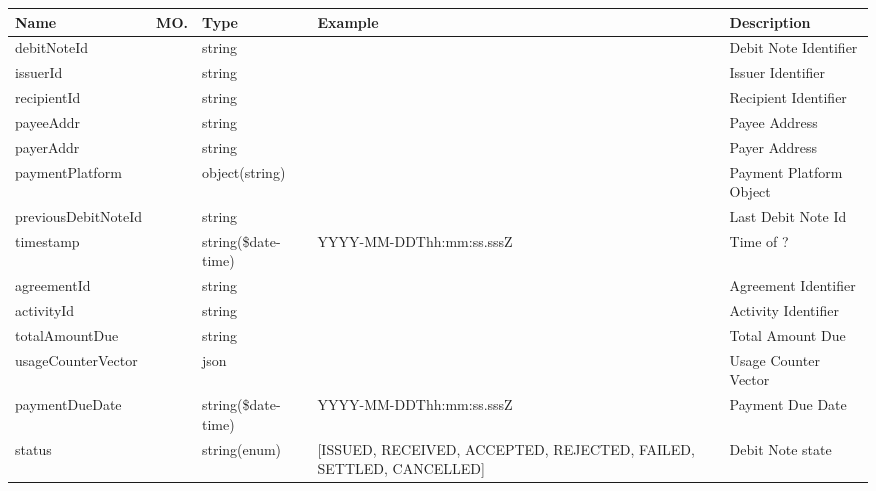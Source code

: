 \begin{enumerate}
\begin{table}
\footnotesize

\begin{center}
\begin{tabular}{|p{3cm}|l|p{3cm}|p{3cm}|p{4cm}|} 
\hline
\rowcolor{lightgray}	Name	& MO.	& Type	& Example & 	Description \\
\hline

debitNoteId				&	&	string				&																		&	Debit Note Identifier \\
\hline   

issuerId				&	&	string				&																		&	Issuer Identifier \\
\hline   
  
recipientId				&	&	string				&																		&	Recipient Identifier \\
\hline   

payeeAddr				&	&	string				&																		&	Payee Address \\
\hline   
  
payerAddr				&	&	string				&																		&	Payer Address \\
\hline
   
paymentPlatform			&	&	object(string)		&																		&	Payment Platform Object \\
\hline

previousDebitNoteId		&	&	string				&																		& 	Last Debit Note Id \\
\hline

timestamp				&   &	string(\$date-time)	&	YYYY-MM-DDThh:mm:ss.sssZ											&	Time of ? \\
\hline

agreementId				& 	& 	string				&																		&	Agreement Identifier \\ 
\hline

activityId				& 	& 	string				&																		&	Activity Identifier \\ 
\hline

totalAmountDue			& 	& 	string				&																		&	Total Amount Due \\ 
\hline

usageCounterVector		&   & 	json				&																		&	Usage Counter Vector \\
\hline

paymentDueDate			&   &	string(\$date-time)	&	YYYY-MM-DDThh:mm:ss.sssZ											&	Payment Due Date \\
\hline

status					&	&	string(enum)		&	[ISSUED, RECEIVED, ACCEPTED, REJECTED, FAILED, SETTLED, CANCELLED]	& 	Debit Note state \\	
\hline


\end{tabular}
\end{center}
\end{table}
\end{enumerate}
